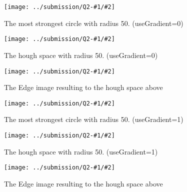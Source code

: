 \documentclass{article}
\newcommand{\listFigure}[4]{
\begin{figure}[H]
	\texttt{[image: ../submission/Q2-\#1/\#2]}
	\caption{#3\label{fig:#4}}
\end{figure}		
}
\begin{document}
	 \listFigure{2}{Q2-2-circles-radius-50-Grad-0--n-1-jupiter.png}{The
	most strongest circle with radius 50. (useGradient=0)}{outputC1G0R70}
	\listFigure{2}{Q2-2-houghSpace-radius-50-Grad-0--n-1-jupiter.png}{The
	hough space with radius 50. (useGradient=0)}{sampleHough}
	\listFigure{2}{Q2-2-edges-radius-50-Grad-0--n-1-jupiter.png}{The
	 Edge image resulting to the hough space above}{houghC3G0R10}
	 
	 	 
	\listFigure{2}{Q2-2-circles-radius-50-Grad-1--n-1-jupiter.png}{The
	most strongest circle with radius 50. (useGradient=1)}{outputdiscuss}
	\listFigure{2}{Q2-2-houghSpace-radius-50-Grad-0--n-1-jupiter.png}{The
	hough space with radius 50. (useGradient=1)}{houghC1G0R70}
	\listFigure{2}{Q2-2-edges-radius-50-Grad-1--n-1-jupiter.png}{The
	 Edge image resulting to the hough space above}{edgediscuss}
	 
\end{document}
